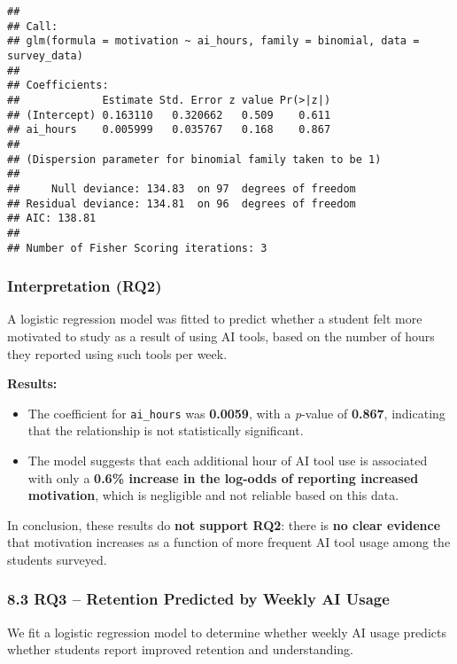\documentclass[
]{article}
\providecommand{\tightlist}{%
  \setlength{\itemsep}{0pt}\setlength{\parskip}{0pt}}
\begin{document}
\begin{verbatim}
## 
## Call:
## glm(formula = motivation ~ ai_hours, family = binomial, data = survey_data)
## 
## Coefficients:
##             Estimate Std. Error z value Pr(>|z|)
## (Intercept) 0.163110   0.320662   0.509    0.611
## ai_hours    0.005999   0.035767   0.168    0.867
## 
## (Dispersion parameter for binomial family taken to be 1)
## 
##     Null deviance: 134.83  on 97  degrees of freedom
## Residual deviance: 134.81  on 96  degrees of freedom
## AIC: 138.81
## 
## Number of Fisher Scoring iterations: 3
\end{verbatim}

\subsubsection{Interpretation (RQ2)}\label{interpretation-rq2}

A logistic regression model was fitted to predict whether a student felt
more motivated to study as a result of using AI tools, based on the
number of hours they reported using such tools per week.

\textbf{Results:}

\begin{itemize}
\tightlist
\item
  The coefficient for \texttt{ai\_hours} was \textbf{0.0059}, with a
  \emph{p}-value of \textbf{0.867}, indicating that the relationship is
  not statistically significant.
\item
  The model suggests that each additional hour of AI tool use is
  associated with only a \textbf{0.6\% increase in the log-odds of
  reporting increased motivation}, which is negligible and not reliable
  based on this data.
\end{itemize}

In conclusion, these results do \textbf{not support RQ2}: there is
\textbf{no clear evidence} that motivation increases as a function of
more frequent AI tool usage among the students surveyed.

\subsubsection{8.3 RQ3 -- Retention Predicted by Weekly AI
Usage}\label{rq3-retention-predicted-by-weekly-ai-usage}

We fit a logistic regression model to determine whether weekly AI usage
predicts whether students report improved retention and understanding.
\end{document}
